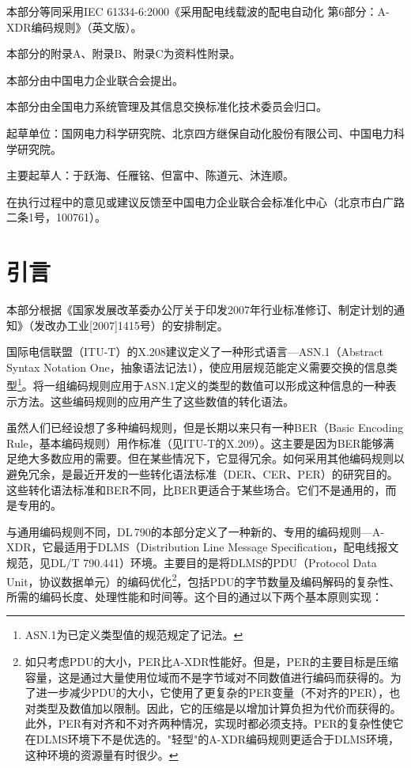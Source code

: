 \documentclass[a4paper,11pt]{ctexart}
\begin{document}
本部分等同采用IEC 61334-6:2000《采用配电线载波的配电自动化 第6部分：A-XDR编码规则》（英文版）。

本部分的附录A、附录B、附录C为资料性附录。

本部分由中国电力企业联合会提出。

本部分由全国电力系统管理及其信息交换标准化技术委员会归口。

起草单位：国网电力科学研究院、北京四方继保自动化股份有限公司、中国电力科学研究院。

主要起草人：于跃海、任雁铭、但富中、陈道元、沐连顺。

在执行过程中的意见或建议反馈至中国电力企业联合会标准化中心（北京市白广路二条1号，100761）。

\newpage

\section*{引言}

本部分根据《国家发展改革委办公厅关于印发2007年行业标准修订、制定计划的通知》（发改办工业[2007]1415号）的安排制定。

国际电信联盟（ITU-T）的X.208建议定义了一种形式语言---ASN.1（Abstract Syntax Notation One，抽象语法记法1），使应用层规范能定义需要交换的信息类型\footnote{ASN.1为已定义类型值的规范规定了记法。}。将一组编码规则应用于ASN.1定义的类型的数值可以形成这种信息的一种表示方法。这些编码规则的应用产生了这些数值的转化语法。

虽然人们已经设想了多种编码规则，但是长期以来只有一种BER（Basic Encoding Rule，基本编码规则）用作标准（见ITU-T的X.209）。这主要是因为BER能够满足绝大多数应用的需要。但在某些情况下，它显得冗余。如何采用其他编码规则以避免冗余，是最近开发的一些转化语法标准（DER、CER、PER）的研究目的。这些转化语法标准和BER不同，比BER更适合于某些场合。它们不是通用的，而是专用的。

与通用编码规则不同，DL\,790的本部分定义了一种新的、专用的编码规则---A-XDR，它最适用于DLMS（Distribution Line Message Specification，配电线报文规范，见DL/T 790.441）环境。主要目的是将DLMS的PDU（Protocol Data Unit，协议数据单元）的编码优化\footnote{如只考虑PDU的大小，PER比A-XDR性能好。但是，PER的主要目标是压缩容量，这是通过大量使用位域而不是字节域对不同数值进行编码而获得的。为了进一步减少PDU的大小，它使用了更复杂的PER变量（不对齐的PER），也对类型及数值加以限制。因此，它的压缩是以增加计算负担为代价而获得的。此外，PER有对齐和不对齐两种情况，实现时都必须支持。PER的复杂性使它在DLMS环境下不是优选的。"轻型"的A-XDR编码规则更适合于DLMS环境，这种环境的资源量有时很少。}，包括PDU的字节数量及编码解码的复杂性、所需的编码长度、处理性能和时间等。这个目的通过以下两个基本原则实现：
\end{document}
